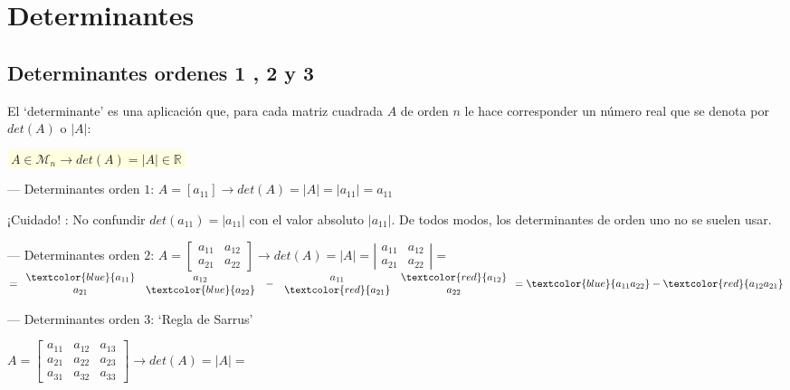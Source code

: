 
\chapter{Determinantes}	

\section{Determinantes ordenes 1 , 2 y 3}

\begin{defi}
El `determinante' es una aplicación que, para cada matriz cuadrada $A$ de orden $n$ le hace corresponder un número real que se denota por $det(A)$ o $|A|$:

\vspace{2mm}\centerline{\colorbox{LightYellow}{$\boxed{\; A\in \mathcal M_n \to det(A)=|A|\in \mathbb R\; }$}}

\vspace{3mm} --- Determinantes orden $1$: $A=[a_{11}] \to det(A)=|A|=|a_{11}|=a_{11}$

¡Cuidado! : No confundir $det(a_{11})=|a_{11}|$ con el valor absoluto $|a_{11}|$. De todos modos, los determinantes de orden uno no se suelen usar.

\vspace{3mm} --- Determinantes orden $2$: $A=\left[
\begin{array}{cc}
a_{11} & a_{12} \\
a_{21} & a_{22}
\end{array}
\right]	
 \to det(A)=|A|=\left|
 \begin{array}{cc}
a_{11} & a_{12} \\
a_{21} & a_{22}
\end{array} \right|=$
$=\begin{array}{cc}
\textcolor{blue}{a_{11}} & a_{12} \\
a_{21} & \textcolor{blue}{a_{22}}
\end{array} \; -\; 
\begin{array}{cc}
a_{11} & \textcolor{red}{a_{12}} \\
\textcolor{red}{a_{21}} & a_{22}
\end{array}
=\textcolor{blue}{a_{11}a_{22}} - \textcolor{red}{a_{12}a_{21}}$




\vspace{3mm} --- Determinantes orden $3$: `Regla de Sarrus'

$A=\left[ \begin{array}{ccc}
a_{11} & a_{12} & a_{13} \\
a_{21} & a_{22} & a_{23} \\
a_{31} & a_{32} & a_{33}
\end{array}   \right] \to det(A)=|A|=$


\end{defi}
